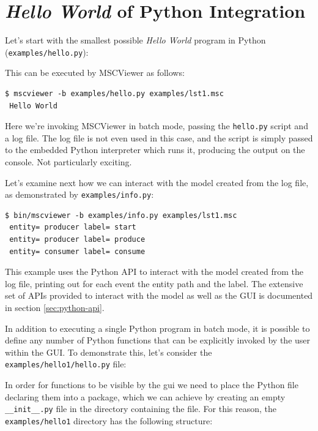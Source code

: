 \documentclass[11pt, twoside, titlepage]{book}
\newcommand{\prog}{MSCViewer}
\begin{document}
\section{\textit{Hello World} of Python Integration}

Let's start with the smallest possible \textit{Hello World} program in Python (\texttt{examples/hello.py}):



This can be executed by \prog{} as follows:

\begin{verbatim}
$ mscviewer -b examples/hello.py examples/lst1.msc 
 Hello World
\end{verbatim}

Here we're invoking \prog{} in batch mode, passing the \texttt{hello.py} script and
a log file. The log file is not even used in this case, and the script is simply
passed to the embedded Python interpreter which runs it, producing the output on
the console. Not particularly exciting.

Let's examine next how we can interact with the model created from the log file, as
demonstrated by \texttt{examples/info.py}:



\begin{verbatim}
$ bin/mscviewer -b examples/info.py examples/lst1.msc
 entity= producer label= start
 entity= producer label= produce
 entity= consumer label= consume
\end{verbatim}

This example uses the Python API to interact with the model created from the log file, 
printing out for each event the entity path and the label. The extensive set of APIs 
provided to interact with the model as well as the GUI is documented in section
\ref{sec:python-api}.

In addition to executing a single Python program in batch mode, it is possible
to define any number of Python functions that can be explicitly invoked by the
user within the GUI. To demonstrate this, let's consider the \texttt{examples/hello1/hello.py}
file:


 
In order for functions to be visible by the gui we need to place the Python file declaring them
into a package, which we can achieve by creating an empty \texttt{\_\_init\_\_.py} file in the 
directory containing the file. For this reason, the \texttt{examples/hello1} directory has
the following structure:
\end{document}
